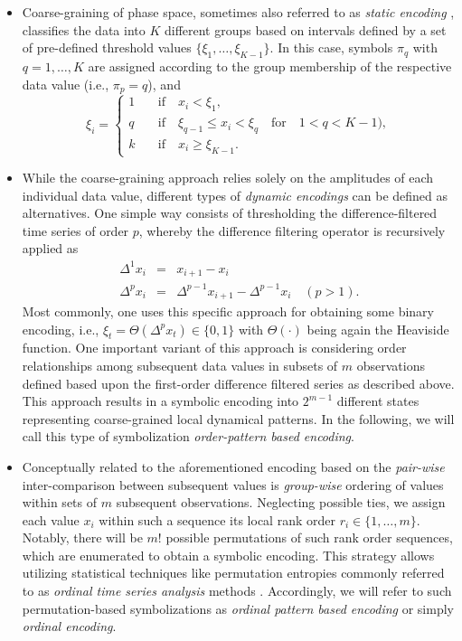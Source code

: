 \begin{itemize}

\item Coarse-graining of phase space, sometimes also referred to as \emph{static encoding} \cite{Donner2008}, classifies the data into $K$ different groups based on intervals defined by a set of pre-defined threshold values $\{\xi_1,\dots,\xi_{K-1}\}$. In this case, symbols $\pi_q$ with $q=1,\dots,K$ are assigned according to the group membership of the respective data value (i.e., $\pi_p=q$), and
\begin{equation}
\xi_i=\left\{
\begin{array}{ll}
1 & \quad \mbox{if} \quad x_i < \xi_1, \\
q & \quad \mbox{if} \quad \xi_{q-1} \leq x_i < \xi_q \quad \mbox{for} \quad 1<q<K-1), \\
k & \quad \mbox{if} \quad x_i \geq \xi_{K-1}.
\end{array} \right.
\end{equation}

\item While the coarse-graining approach relies solely on the amplitudes of each individual data value, different types of \emph{dynamic encodings} can be defined as alternatives. One simple way consists of thresholding the difference-filtered time series of order $p$, whereby the difference filtering operator is recursively applied as
\begin{eqnarray}
\Delta^{1}x_i &=& x_{i+1}-x_i \\
\Delta^{p}x_i &=& \Delta^{p-1}x_{i+1}-\Delta^{p-1}x_i \quad (p>1).
\end{eqnarray}
\noindent
Most commonly, one uses this specific approach for obtaining some binary encoding, i.e., $\xi_t=\Theta(\Delta^{p}x_t)\in\{0,1\}$ with $\Theta(\cdot)$ being again the Heaviside function. One important variant of this approach is considering order relationships among subsequent data values in subsets of $m$ observations defined based upon the first-order difference filtered series as described above. This approach results in a symbolic encoding into $2^{m-1}$ different states representing coarse-grained local dynamical patterns. In the following, we will call this type of symbolization \emph{order-pattern based encoding}.

\item Conceptually related to the aforementioned encoding based on the \emph{pair-wise} inter-comparison between subsequent values is \emph{group-wise} ordering of values within sets of $m$ subsequent observations. Neglecting possible ties, we assign each value $x_i$ within such a sequence its local rank order $r_i\in\{1,\dots,m\}$. Notably, there will be $m!$ possible permutations of such rank order sequences, which are enumerated to obtain a symbolic encoding. This strategy allows utilizing statistical techniques like permutation entropies \cite{Bandt2002} commonly referred to as \emph{ordinal time series analysis} methods \cite{bandt2005}. Accordingly, we will refer to such permutation-based symbolizations as \emph{ordinal pattern based encoding} or simply \emph{ordinal encoding}.

\end{itemize}

